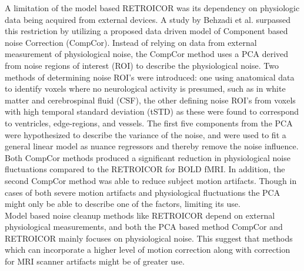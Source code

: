 A limitation of the model based RETROICOR was its dependency on physiologic data being acquired from external devices. A study by Behzadi et al. \cite{Behzadi2013} surpassed this restriction by utilizing a proposed data driven model of Component based noise Correction (CompCor). Instead of relying on data from external measurement of physiological noise, the CompCor method uses a PCA derived from noise regions of interest (ROI) to describe the physiological noise. Two methods of determining noise ROI’s were introduced: one using anatomical data to identify voxels where no neurological activity is presumed, such as in white matter and cerebrospinal fluid (CSF), the other defining noise ROI’s from voxels with high temporal standard deviation (tSTD) as these were found to correspond to ventricles, edge-regions, and vessels. The first five components from the PCA were hypothesized to describe the variance of the noise, and were used to fit a general linear model as nuance regressors and thereby remove the noise influence. Both CompCor methods produced a significant reduction in physiological noise fluctuations compared to the RETROICOR for BOLD fMRI. In addition, the second CompCor method was able to reduce subject motion artifacts. Though in cases of both severe motion artifacts and physiological fluctuations the PCA might only be able to describe one of the factors, limiting its use. \cite{Behzadi2013} \\
Model based noise cleanup methods like RETROICOR depend on external physiological measurements, and both the PCA based method CompCor and RETROICOR mainly focuses on physiological noise. This suggest that methods which can incorporate a higher level of motion correction along with correction for MRI scanner artifacts might be of greater use. \\
